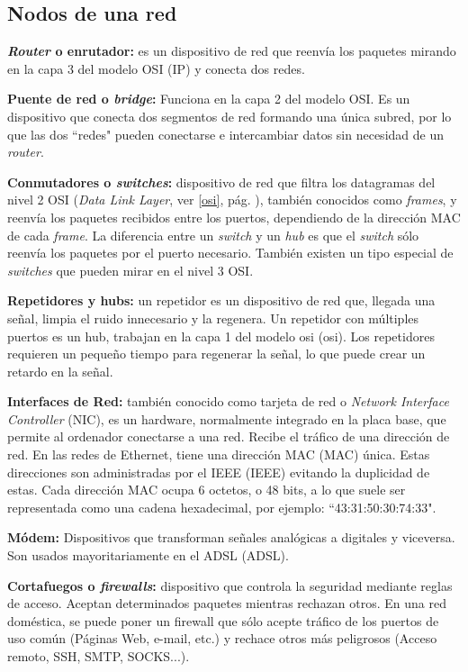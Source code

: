 \documentclass[a4paper, 11pt, twoside]{report} %
\newcommand{\acr}[1]{\acrshort{#1} (\acrlong{#1})}
\begin{document}
\subsection{Nodos de una red}
\begin{description}
\item \textbf{\textit{Router} o enrutador:} es un dispositivo de red que reenvía los paquetes mirando en la capa 3 del modelo OSI (IP) y conecta dos redes.
\item \textbf{Puente de red o \textit{bridge}:} Funciona en la capa 2 del modelo OSI. Es un dispositivo que conecta dos segmentos de red formando una única subred, por lo que las dos ``redes" pueden conectarse e intercambiar datos sin necesidad de un \textit{router}.
\item \textbf{Conmutadores o \textit{switches}:} dispositivo de red que filtra los datagramas del nivel 2 OSI (\textit{Data Link Layer}, ver \ref{osi}, pág. \pageref{osi}), también conocidos como \textit{frames}, y reenvía los paquetes recibidos entre los puertos, dependiendo de la dirección MAC de cada \textit{frame}. La diferencia entre un \textit{switch} y un \textit{hub} es que el \textit{switch} sólo reenvía los paquetes por el puerto necesario. También existen un tipo especial de \textit{switches} que pueden mirar en el nivel 3 OSI.
\item \textbf{Repetidores y hubs:} un repetidor es un dispositivo de red que, llegada una señal, limpia el ruido innecesario y la regenera. Un repetidor con múltiples puertos es un hub, trabajan en la capa 1 del modelo \acr{osi}. Los repetidores requieren un pequeño tiempo para regenerar la señal, lo que puede crear un retardo en la señal.
\item \textbf{Interfaces de Red:} también conocido como tarjeta de red o \textit{Network Interface Controller} (NIC), es un \gls{hardware}, normalmente integrado en la placa base, que permite al ordenador conectarse a una red. Recibe el tráfico de una dirección de red. En las redes de Ethernet, tiene una dirección \acr{MAC} única. Estas direcciones son administradas por el \acr{IEEE} evitando la duplicidad de estas. Cada dirección MAC ocupa 6 octetos, o 48 bits, a lo que suele ser representada como una cadena hexadecimal, por ejemplo: ``43:31:50:30:74:33".
\item \textbf{Módem:} Dispositivos que transforman señales analógicas a digitales y viceversa. Son usados mayoritariamente en el \acr{ADSL}.
\item \textbf{Cortafuegos o \textit{firewalls}:} dispositivo que controla la seguridad mediante reglas de acceso. Aceptan determinados paquetes mientras rechazan otros. En una red doméstica, se puede poner un firewall que sólo acepte tráfico de los puertos de uso común (Páginas Web, e-mail, etc.) y rechace otros más peligrosos (Acceso remoto, SSH, SMTP, SOCKS...).
\end{description}
\end{document}

